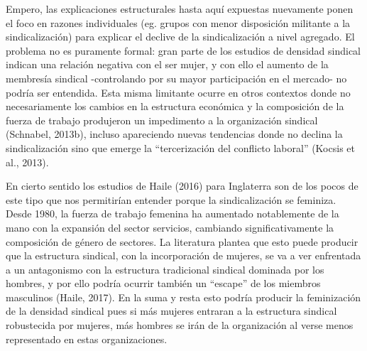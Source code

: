 \documentclass[
]{book}
\begin{document}
Empero, las explicaciones estructurales hasta aquí expuestas nuevamente ponen el foco en razones individuales (eg. grupos con menor disposición militante a la sindicalización) para explicar el declive de la sindicalización a nivel agregado. El problema no es puramente formal: gran parte de los estudios de densidad sindical indican una relación negativa con el ser mujer, y con ello el aumento de la membresía sindical -controlando por su mayor participación en el mercado- no podría ser entendida. Esta misma limitante ocurre en otros contextos donde no necesariamente los cambios en la estructura económica y la composición de la fuerza de trabajo produjeron un impedimento a la organización sindical (Schnabel, 2013b), incluso apareciendo nuevas tendencias donde no declina la sindicalización sino que emerge la ``tercerización del conflicto laboral'' (Kocsis et al., 2013).

En cierto sentido los estudios de Haile (2016) para Inglaterra son de los pocos de este tipo que nos permitirían entender porque la sindicalización se feminiza. Desde 1980, la fuerza de trabajo femenina ha aumentado notablemente de la mano con la expansión del sector servicios, cambiando significativamente la composición de género de sectores. La literatura plantea que esto puede producir que la estructura sindical, con la incorporación de mujeres, se va a ver enfrentada a un antagonismo con la estructura tradicional sindical dominada por los hombres, y por ello podría ocurrir también un ``escape'' de los miembros masculinos (Haile, 2017). En la suma y resta esto podría producir la feminización de la densidad sindical pues si más mujeres entraran a la estructura sindical robustecida por mujeres, más hombres se irán de la organización al verse menos representado en estas organizaciones.
\end{document}
